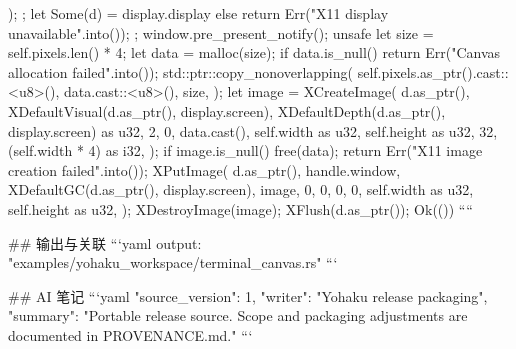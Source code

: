 {{{            );
        };
        let Some(d) = display.display else {
            return Err("X11 display unavailable".into());
        };
        window.pre_present_notify();
        unsafe {
            let size = self.pixels.len() * 4;
            let data = malloc(size);
            if data.is_null() {
                return Err("Canvas allocation failed".into());
            }
            std::ptr::copy_nonoverlapping(
                self.pixels.as_ptr().cast::<u8>(),
                data.cast::<u8>(),
                size,
            );
            let image = XCreateImage(
                d.as_ptr(),
                XDefaultVisual(d.as_ptr(), display.screen),
                XDefaultDepth(d.as_ptr(), display.screen) as u32,
                2,
                0,
                data.cast(),
                self.width as u32,
                self.height as u32,
                32,
                (self.width * 4) as i32,
            );
            if image.is_null() {
                free(data);
                return Err("X11 image creation failed".into());
            }
            XPutImage(
                d.as_ptr(),
                handle.window,
                XDefaultGC(d.as_ptr(), display.screen),
                image,
                0,
                0,
                0,
                0,
                self.width as u32,
                self.height as u32,
            );
            XDestroyImage(image);
            XFlush(d.as_ptr());
        }
        Ok(())
    }
}
````

## 输出与关联
```yaml
output: "examples/yohaku_workspace/terminal_canvas.rs"
```

## AI 笔记
```yaml
{"source_version": 1, "writer": "Yohaku release packaging", "summary": "Portable release source. Scope and packaging adjustments are documented in PROVENANCE.md."}
```
